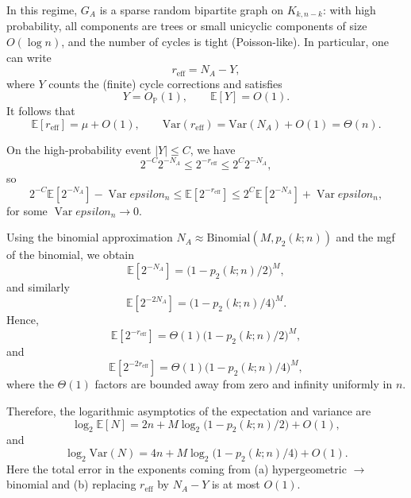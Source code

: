 \documentclass[a4paper,onecolumn,notitlepage,nofootinbib,longbibliography,superscriptaddress, floatfix, pra, aps, 10pt]{revtex4-2}
\begin{document}
In this regime, $G_A$ is a sparse random bipartite graph on $K_{k,n-k}$: with high probability, all components are trees or small unicyclic components of size $O(\log n)$, and the number of cycles is tight (Poisson-like). In particular, one can write
\begin{equation}
  r_{\mathrm{eff}} = N_A - Y,
\end{equation}
where $Y$ counts the (finite) cycle corrections and satisfies
\begin{equation}
  Y = O_{\mathbb{P}}(1),\qquad \mathbb{E}[Y] = O(1).
\end{equation}
It follows that
\begin{equation}
  \mathbb{E}[r_{\mathrm{eff}}] = \mu + O(1),
  \qquad 
  \mathrm{Var}(r_{\mathrm{eff}}) = \mathrm{Var}(N_A) + O(1) = \Theta(n).
\end{equation}

On the high-probability event $|Y|\le C$, we have
\begin{equation}
  2^{-C}2^{-N_A} \le 2^{-r_{\mathrm{eff}}} \le 2^{C}2^{-N_A},
\end{equation}
so
\begin{equation}
  2^{-C}\mathbb{E}[2^{-N_A}] - \operatorname*{Var}epsilon_n
  \le \mathbb{E}[2^{-r_{\mathrm{eff}}}]
  \le 2^{C}\mathbb{E}[2^{-N_A}] + \operatorname*{Var}epsilon_n,
\end{equation}
for some $\operatorname*{Var}epsilon_n\to 0$.

Using the binomial approximation $N_A\approx\mathrm{Binomial}(M,p_2(k;n))$ and the mgf of the binomial, we obtain
\begin{equation}
  \mathbb{E}[2^{-N_A}] = \big(1 - p_2(k;n)/2\big)^M,
\end{equation}
and similarly
\begin{equation}
  \mathbb{E}[2^{-2N_A}] = \big(1 - p_2(k;n)/4\big)^M.
\end{equation}
Hence,
\begin{equation}
  \mathbb{E}[2^{-r_{\mathrm{eff}}}]
  = \Theta(1)\big(1 - p_2(k;n)/2\big)^M,
\end{equation}
and
\begin{equation}
  \mathbb{E}[2^{-2r_{\mathrm{eff}}}]
  = \Theta(1)\big(1 - p_2(k;n)/4\big)^M,
\end{equation}
where the $\Theta(1)$ factors are bounded away from zero and infinity uniformly in $n$.

Therefore, the logarithmic asymptotics of the expectation and variance are
\begin{equation}
  \log_2\mathbb{E}[N]
  = 2n + M\log_2\big(1 - p_2(k;n)/2\big) + O(1),
\end{equation}
and
\begin{equation}
  \log_2\mathrm{Var}(N)
  = 4n + M\log_2\big(1 - p_2(k;n)/4\big) + O(1).
\end{equation}
Here the total error in the exponents coming from (a) hypergeometric $\to$ binomial and (b) replacing $r_{\mathrm{eff}}$ by $N_A-Y$ is at most $O(1)$.
\end{document}
